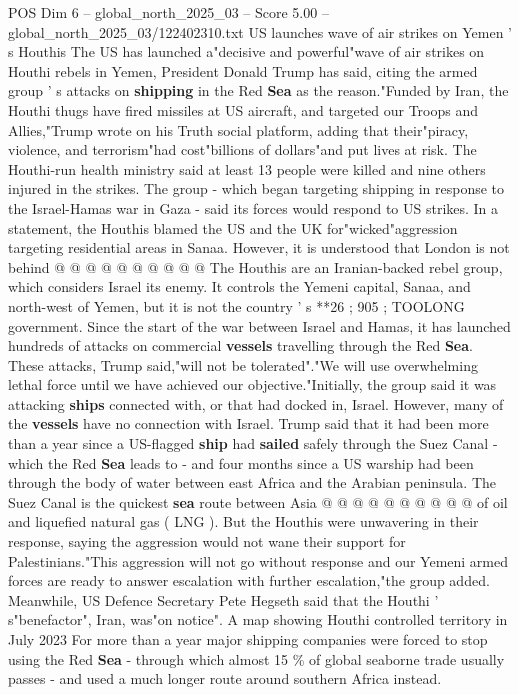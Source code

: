 \begin{textsample}{POS Dim 6 – global\_north\_2025\_03 – Score 5.00 – global\_north\_2025\_03/122402310.txt}  \label{ex:f6_pos_280}
US launches wave of air strikes on Yemen ' s Houthis The US has launched a"decisive and powerful"wave of air strikes on Houthi rebels in Yemen, President Donald Trump has said, citing the armed group ' s attacks on \textbf{shipping} in the Red \textbf{Sea} as the reason."Funded by Iran, the Houthi thugs have fired missiles at US aircraft, and targeted our Troops and Allies,"Trump wrote on his Truth social platform, adding that their"piracy, violence, and terrorism"had cost"billions of dollars"and put lives at risk.
The Houthi-run health ministry said at least 13 people were killed and nine others injured in the strikes.
The group - which began targeting shipping in response to the Israel-Hamas war in Gaza - said its forces would respond to US strikes.
In a statement, the Houthis blamed the US and the UK for"wicked"aggression targeting residential areas in Sanaa.
However, it is understood that London is not behind @ @ @ @ @ @ @ @ @ @ The Houthis are an Iranian-backed rebel group, which considers Israel its enemy.
It controls the Yemeni capital, Sanaa, and north-west of Yemen, but it is not the country ' s **26 ; 905 ; TOOLONG government.
Since the start of the war between Israel and Hamas, it has launched hundreds of attacks on commercial \textbf{vessels} travelling through the Red \textbf{Sea}.
These attacks, Trump said,"will not be tolerated"."We will use overwhelming lethal force until we have achieved our objective."Initially, the group said it was attacking \textbf{ships} connected with, or that had docked in, Israel.
However, many of the \textbf{vessels} have no connection with Israel.
Trump said that it had been more than a year since a US-flagged \textbf{ship} had \textbf{sailed} safely through the Suez Canal - which the Red \textbf{Sea} leads to - and four months since a US warship had been through the body of water between east Africa and the Arabian peninsula.
The Suez Canal is the quickest \textbf{sea} route between Asia @ @ @ @ @ @ @ @ @ @ of oil and liquefied natural gas ( LNG ).
But the Houthis were unwavering in their response, saying the aggression would not wane their support for Palestinians."This aggression will not go without response and our Yemeni armed forces are ready to answer escalation with further escalation,"the group added.
Meanwhile, US Defence Secretary Pete Hegseth said that the Houthi ' s"benefactor", Iran, was"on notice".
A map showing Houthi controlled territory in July 2023 For more than a year major shipping companies were forced to stop using the Red \textbf{Sea} - through which almost 15 \% of global seaborne trade usually passes - and used a much longer route around southern Africa instead.

\end{textsample}
